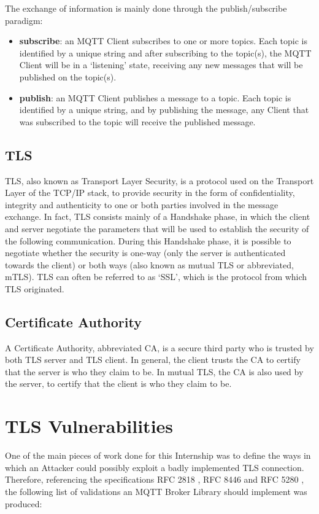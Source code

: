 \documentclass[binding=0.6cm,noexaminfo]{sapthesis}
\begin{document}
The exchange of information is mainly done through the publish/subscribe paradigm:
\begin{itemize}
	\item \textbf{subscribe}: an MQTT Client subscribes to one or more topics. Each topic is identified by a unique string and after subscribing to the topic(s), the MQTT Client will be in a `listening' state, receiving any new messages that will be published on the topic(s).
	\item \textbf{publish}: an MQTT Client publishes a message to a topic. Each topic is identified by a unique string, and by publishing the message, any Client that was subscribed to the topic will receive the published message.
\end{itemize}

\subsection{TLS}
TLS, also known as Transport Layer Security, is a protocol used on the Transport Layer of the TCP/IP stack, to provide security in the form of confidentiality, integrity and authenticity to one or both parties involved in the message exchange. In fact, TLS consists mainly of a Handshake phase, in which the client and server negotiate the parameters that will be used to establish the security of the following communication. During this Handshake phase, it is possible to negotiate whether the security is one-way (only the server is authenticated towards the client) or both ways (also known as mutual TLS or abbreviated, mTLS). TLS can often be referred to as `SSL', which is the protocol from which TLS originated.

\subsection{Certificate Authority}
A Certificate Authority, abbreviated CA, is a secure third party who is trusted by both TLS server and TLS client. In general, the client trusts the CA to certify that the server is who they claim to be. In mutual TLS, the CA is also used by the server, to certify that the client is who they claim to be.

\section{TLS Vulnerabilities}\label{sec:tls_vulnerabilities}
One of the main pieces of work done for this Internship was to define the ways in which an Attacker could possibly exploit a badly implemented TLS connection. Therefore, referencing the specifications RFC 2818 \cite{rfc2818}, RFC 8446 \cite{rfc8446} and RFC 5280 \cite{rfc5280}, the following list of validations an MQTT Broker Library should implement was produced:
\end{document}
